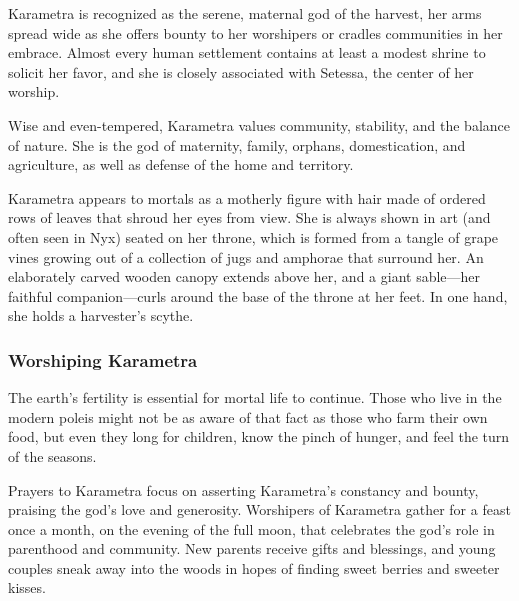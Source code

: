     Karametra is recognized as the serene, maternal god of the harvest, her arms spread wide as she offers bounty to her worshipers or cradles communities in her embrace. Almost every human settlement contains at least a modest shrine to solicit her favor, and she is closely associated with Setessa, the center of her worship.

    Wise and even-tempered, Karametra values community, stability, and the balance of nature. She is the god of maternity, family, orphans, domestication, and agriculture, as well as defense of the home and territory.

    Karametra appears to mortals as a motherly figure with hair made of ordered rows of leaves that shroud her eyes from view. She is always shown in art (and often seen in Nyx) seated on her throne, which is formed from a tangle of grape vines growing out of a collection of jugs and amphorae that surround her. An elaborately carved wooden canopy extends above her, and a giant sable—her faithful companion—curls around the base of the throne at her feet. In one hand, she holds a harvester's scythe.

    \subsubsection{Worshiping Karametra}
        The earth's fertility is essential for mortal life to continue. Those who live in the modern poleis might not be as aware of that fact as those who farm their own food, but even they long for children, know the pinch of hunger, and feel the turn of the seasons.

        Prayers to Karametra focus on asserting Karametra's constancy and bounty, praising the god's love and generosity. Worshipers of Karametra gather for a feast once a month, on the evening of the full moon, that celebrates the god's role in parenthood and community. New parents receive gifts and blessings, and young couples sneak away into the woods in hopes of finding sweet berries and sweeter kisses.
